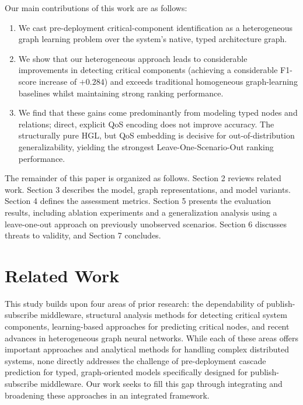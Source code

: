\documentclass[sigconf,9pt,anonymous]{acmart}
\begin{document}
Our main contributions of this work are as follows:

\begin{enumerate}

    \item We cast pre-deployment critical-component identification as a heterogeneous graph learning problem over the system's native, typed architecture graph.
    \item We show that our heterogeneous approach leads to considerable improvements in detecting critical components (achieving a considerable F1-score increase of $+0.284$) and exceeds traditional homogeneous graph-learning baselines whilst maintaining strong ranking performance.

    \item We find that these gains come predominantly from modeling typed nodes and relations; direct, explicit QoS encoding does not improve accuracy. The structurally pure HGL, but QoS embedding is decisive for out-of-distribution generalizability, yielding the strongest Leave-One-Scenario-Out ranking performance.
\end{enumerate}

The remainder of this paper is organized as follows. Section 2 reviews related work. Section 3 describes the model, graph representations, and model variants. Section 4 defines the assessment metrics. Section 5 presents the evaluation results, including ablation experiments and a generalization analysis using a leave-one-out approach on previously unobserved scenarios. Section 6 discusses threats to validity, and Section 7 concludes.

\section{Related Work}

This study builds upon four areas of prior research: the dependability of publish-subscribe middleware, structural analysis methods for detecting critical system components, learning-based approaches for predicting critical nodes, and recent advances in heterogeneous graph neural networks. While each of these areas offers important approaches and analytical methods for handling complex distributed systems, none directly addresses the challenge of pre-deployment cascade prediction for typed, graph-oriented models specifically designed for publish-subscribe middleware. Our work seeks to fill this gap through integrating and broadening these approaches in an integrated framework.
\end{document}
